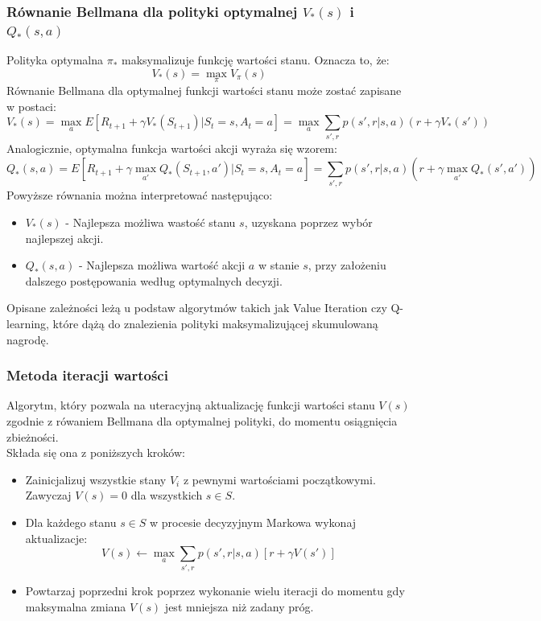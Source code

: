 \documentclass[a4paper, 12pt]{article}
\numberwithin{equation}{section}
\begin{document}
    \subsubsection{Równanie Bellmana dla polityki optymalnej \( V_*(s) \) i \( Q_*(s,a) \)}
    Polityka optymalna \( \pi_* \) maksymalizuje funkcję wartości stanu. Oznacza to, że:
    \begin{equation}
    V_*(s) = \max_{\pi} V_{\pi}(s)
    \end{equation}
    Równanie Bellmana dla optymalnej funkcji wartości stanu może zostać zapisane w postaci:
    \begin{equation}
    V_*(s) = \max_{a} E[R_{t+1} + \gamma V_*(S_{t+1})|S_t = s, A_t = a] = 
    \max_{a} \sum_{s',r} p(s',r|s,a)(r + \gamma V_*(s'))
    \end{equation}
    Analogicznie, optymalna funkcja wartości akcji wyraża się wzorem:
    \begin{equation}
    Q_*(s,a) = E[R_{t+1} + \gamma \max_{a'} Q_*(S_{t+1},a')|S_t = s, A_t = a] =
    \sum_{s',r} p(s',r|s,a)(r + \gamma \max_{a'} Q_*(s',a'))
    \end{equation}
    Powyższe równania można interpretować następująco:
    \begin{itemize}
        \item \( V_*(s) \) - Najlepsza możliwa wastość stanu \( s \), uzyskana poprzez wybór najlepszej akcji.
        \item \( Q_*(s,a) \) - Najlepsza możliwa wartość akcji \( a \) w stanie \( s \), przy założeniu dalszego postępowania według optymalnych decyzji.
    \end{itemize}
    Opisane zależności leżą u podstaw algorytmów takich jak Value Iteration czy Q-learning, które dążą do znalezienia polityki maksymalizującej skumulowaną nagrodę.
    \subsubsection{Metoda iteracji wartości}
    Algorytm, który pozwala na uteracyjną aktualizację funkcji wartości stanu \( V(s) \) zgodnie z rówaniem Bellmana dla optymalnej polityki, do momentu osiągnięcia zbieżności.
    \\ Składa się ona z poniższych kroków:
    \begin{itemize}
        \item Zainicjalizuj wszystkie stany \( V_i \) z pewnymi wartościami początkowymi. Zawyczaj \( V(s) = 0 \) dla wszystkich \( s \in S \).
        \item Dla każdego stanu \( s \in S \) w procesie decyzyjnym Markowa wykonaj aktualizacje:
        \begin{equation}
        V(s) \leftarrow \max_a \sum_{s',r} p(s',r|s,a)[r + \gamma V(s')]
        \end{equation}
        \item Powtarzaj poprzedni krok poprzez wykonanie wielu iteracji do momentu gdy maksymalna zmiana \( V(s) \) jest mniejsza niż zadany próg. 
    \end{itemize}
\end{document}
